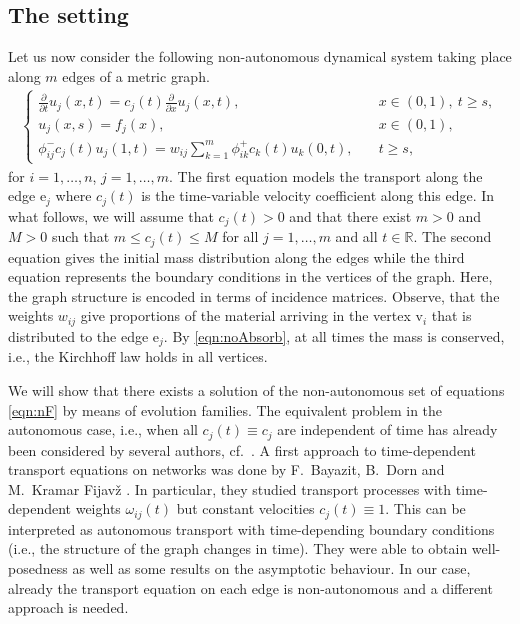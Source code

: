 \documentclass[a4paper,oneside,10pt]{amsart}
\theoremstyle{definition}
\numberwithin{equation}{section}
\def\vv{\mathrm{v}}
\def\ee{\mathrm{e}}
\def\RR{\mathbb{R}}
\begin{document}
\subsection{The setting}
Let us now consider the following non-autonomous dynamical system taking place along $m$ edges of a metric graph. 
\begin{align}\label{eqn:nF}
\tag{nF}
\begin{cases}
\frac{\partial}{\partial t}u_j(x,t)=c_j(t)\frac{\partial}{\partial x}u_j(x,t),&\quad x\in\left(0,1\right),\ t\geq s,\\
u_j(x,s)= f_j(x),&\quad x\in\left(0,1\right),\\ 
\phi^-_{ij}c_j(t)u_j(1,t)= w_{ij}\sum_{k=1}^m{\phi^+_{ik}c_k(t)u_k(0,t)},&\quad t\geq s,
\end{cases}
\end{align}
for $i=1,\dots,n$, $j=1,\dots, m$.
The first equation models the transport along the edge $\ee_j$ where $c_j(t)$ is the time-variable velocity coefficient along this edge. {In what follows, we will assume that $c_j(t)>0$ and that there exist {$m>0$ and $M>0$ }such that $m\leq c_j(t)\leq M$ for all $j=1,\ldots,m$ and all $t\in\RR$.} The second equation gives the initial mass distribution along the edges while the third equation represents the boundary conditions  in the vertices of the graph. Here, the graph structure is encoded in terms of incidence matrices. Observe, that the weights $w_{ij}$ give proportions of the material arriving in the vertex $\vv_i$ that is distributed to the edge $\ee_j$. By \eqref{eqn:noAbsorb}, at all times the mass is conserved, i.e., the Kirchhoff law holds in all vertices.

\medskip
We will show that there exists a solution of the non-autonomous set of equations \eqref{eqn:nF} by means of evolution families. The equivalent problem in the autonomous case, i.e., when all $c_j(t)\equiv c_j$ are independent of time has already been considered by several authors, cf.~\cite{KS2005,KP2020}. A first approach to time-dependent transport equations on networks was done by F.~Bayazit, B.~Dorn and M.~Kramar Fijav\v{z} \cite{BDF2013}.
In particular, they studied transport processes with time-dependent weights $\omega_{ij}(t)$ but constant velocities $c_j(t)\equiv 1$. This can be interpreted as autonomous transport with time-depending boundary conditions (i.e., the structure of the graph changes in time). They were able to obtain well-posedness as well as some results on the asymptotic behaviour. In our case, already the transport equation on each edge is non-autonomous and a different approach is needed.
\end{document}
